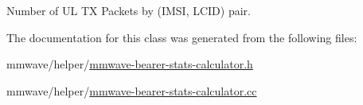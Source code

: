 Number of UL TX Packets by (I\+M\+SI, L\+C\+ID) pair. 



The documentation for this class was generated from the following files\+:\begin{DoxyCompactItemize}
\item 
mmwave/helper/\hyperlink{mmwave-bearer-stats-calculator_8h}{mmwave-\/bearer-\/stats-\/calculator.\+h}\item 
mmwave/helper/\hyperlink{mmwave-bearer-stats-calculator_8cc}{mmwave-\/bearer-\/stats-\/calculator.\+cc}\end{DoxyCompactItemize}
